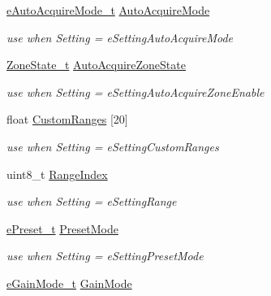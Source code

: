 \begin{DoxyCompactItemize}
\mbox{\hyperlink{namespace_quantum_lib_ad91dac4bf2ef5d3615cb423383b961d8}{e\+Auto\+Acquire\+Mode\+\_\+t}} \mbox{\hyperlink{union_quantum_lib_1_1_setting_data__t_1_1_value__t_ae142aef2013fed97b372db568d1a4ab2}{Auto\+Acquire\+Mode}}
\begin{DoxyCompactList}\small\item\em use when \textquotesingle{}Setting\textquotesingle{} = e\+Setting\+Auto\+Acquire\+Mode \end{DoxyCompactList}\item 
\mbox{\hyperlink{struct_quantum_lib_1_1_zone_state__t}{Zone\+State\+\_\+t}} \mbox{\hyperlink{union_quantum_lib_1_1_setting_data__t_1_1_value__t_a9023a9de2b0e75e3e6e9aa4c6e0f637a}{Auto\+Acquire\+Zone\+State}}
\begin{DoxyCompactList}\small\item\em use when \textquotesingle{}Setting\textquotesingle{} = e\+Setting\+Auto\+Acquire\+Zone\+Enable \end{DoxyCompactList}\item 
float \mbox{\hyperlink{union_quantum_lib_1_1_setting_data__t_1_1_value__t_a75596df234281ebc54c70cd070367260}{Custom\+Ranges}} \mbox{[}20\mbox{]}
\begin{DoxyCompactList}\small\item\em use when \textquotesingle{}Setting\textquotesingle{} = e\+Setting\+Custom\+Ranges \end{DoxyCompactList}\item 
uint8\+\_\+t \mbox{\hyperlink{union_quantum_lib_1_1_setting_data__t_1_1_value__t_a19580d5ecf3ac3da30cc389e7d74dde9}{Range\+Index}}
\begin{DoxyCompactList}\small\item\em use when \textquotesingle{}Setting\textquotesingle{} = e\+Setting\+Range \end{DoxyCompactList}\item 
\mbox{\hyperlink{namespace_quantum_lib_a74d29df2264e3cb8e03e70007c7152f8}{e\+Preset\+\_\+t}} \mbox{\hyperlink{union_quantum_lib_1_1_setting_data__t_1_1_value__t_ae8106e82a3207051881b1acfc59dc760}{Preset\+Mode}}
\begin{DoxyCompactList}\small\item\em use when \textquotesingle{}Setting\textquotesingle{} = e\+Setting\+Preset\+Mode \end{DoxyCompactList}\item 
\mbox{\hyperlink{namespace_quantum_lib_a20b6e658baa33fde788739a47dab2e13}{e\+Gain\+Mode\+\_\+t}} \mbox{\hyperlink{union_quantum_lib_1_1_setting_data__t_1_1_value__t_a0685db339a9f583357616b41470bde5b}{Gain\+Mode}}

\end{DoxyCompactItemize}
